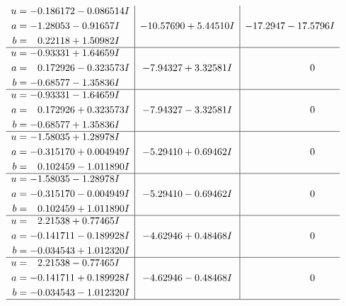 \documentclass[1p]{elsarticle_modified}
\theoremstyle{definition}
\begin{document}
$$\begin{array}{c|c|c}
\begin{aligned}
u &= -0.186172 - 0.086514 I \\
a &= -1.28053 - 0.91657 I \\
b &= \phantom{-}0.22118 + 1.50982 I\end{aligned}
 & -10.57690 + 5.44510 I & -17.2947 - 17.5796 I \\ \hline\begin{aligned}
u &= -0.93331 + 1.64659 I \\
a &= \phantom{-}0.172926 - 0.323573 I \\
b &= -0.68577 - 1.35836 I\end{aligned}
 & -7.94327 + 3.32581 I & \phantom{-0.000000 } 0 \\ \hline\begin{aligned}
u &= -0.93331 - 1.64659 I \\
a &= \phantom{-}0.172926 + 0.323573 I \\
b &= -0.68577 + 1.35836 I\end{aligned}
 & -7.94327 - 3.32581 I & \phantom{-0.000000 } 0 \\ \hline\begin{aligned}
u &= -1.58035 + 1.28978 I \\
a &= -0.315170 + 0.004949 I \\
b &= \phantom{-}0.102459 - 1.011890 I\end{aligned}
 & -5.29410 + 0.69462 I & \phantom{-0.000000 } 0 \\ \hline\begin{aligned}
u &= -1.58035 - 1.28978 I \\
a &= -0.315170 - 0.004949 I \\
b &= \phantom{-}0.102459 + 1.011890 I\end{aligned}
 & -5.29410 - 0.69462 I & \phantom{-0.000000 } 0 \\ \hline\begin{aligned}
u &= \phantom{-}2.21538 + 0.77465 I \\
a &= -0.141711 - 0.189928 I \\
b &= -0.034543 + 1.012320 I\end{aligned}
 & -4.62946 + 0.48468 I & \phantom{-0.000000 } 0 \\ \hline\begin{aligned}
u &= \phantom{-}2.21538 - 0.77465 I \\
a &= -0.141711 + 0.189928 I \\
b &= -0.034543 - 1.012320 I\end{aligned}
 & -4.62946 - 0.48468 I & \phantom{-0.000000 } 0\\
 \hline 
 \end{array}$$\newpage\newpage\renewcommand{\arraystretch}{1}
\end{document}
